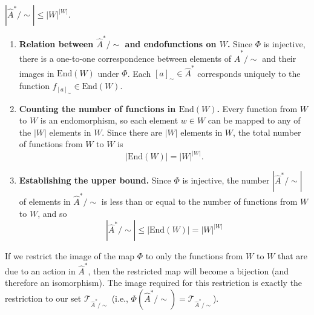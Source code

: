 \begin{propositionE}
    $|\hat{A}^{\ast}/\sim| \leq |W|^{|W|}$.
\end{propositionE}
\begin{proofE}
\begin{enumerate}
    \item \textbf{Relation between $\hat{A}^{\ast}/\sim$ and endofunctions on $W$.}
    Since $\Phi$ is injective, there is a one-to-one correspondence between elements of $\hat{A}^{\ast}/\sim$ and their images in $\text{End}(W)$ under $\Phi$.
    Each $[a]_{\sim} \in \hat{A}^{\ast}$ corresponds uniquely to the function $f_{[a]_{\sim}} \in \text{End}(W)$.

    \item \textbf{Counting the number of functions in $\text{End}(W)$.}
    Every function from $W$ to $W$ is an endomorphism, so each element $w \in W$ can be mapped to any of the $|W|$ elements in $W$.
    Since there are $|W|$ elements in $W$, the total number of functions from $W$ to $W$ is
    \begin{equation}
        |\text{End}(W)| = |W|^{|W|}.
    \end{equation}

    \item \textbf{Establishing the upper bound.}
    Since $\Phi$ is injective, the number $|\hat{A}^{\ast}/\sim|$ of elements in $\hat{A}^{\ast}/\sim$ is less than or equal to the number of functions from $W$ to $W$, and so
    \begin{equation}
        |\hat{A}^{\ast}/\sim| \leq |\text{End}(W)| = |W|^{|W|}
    \end{equation}
\end{enumerate}
\end{proofE}

If we restrict the image of the map $\Phi$ to only the functions from $W$ to $W$ that are due to an action in $\hat{A}^{\ast}$, then the restricted map will become a bijection (and therefore an isomorphism).
The image required for this restriction is exactly the restriction to our set $\mathcal{T}_{\hat{A}^{\ast}/\sim}$ (i.e., $\Phi(\hat{A}^{\ast}/\sim) = \mathcal{T}_{\hat{A}^{\ast}/\sim}$).


